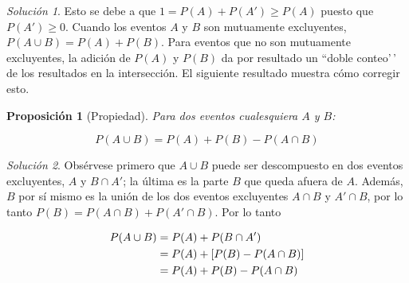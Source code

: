 \documentclass[
  11pt,
]{book}
\newtheorem{proposition}{Proposición}[chapter]
\theoremstyle{definition}
\theoremstyle{definition}
\theoremstyle{definition}
\theoremstyle{definition}
\theoremstyle{remark}
\newtheorem*{solution}{Solución }
\begin{document}
\begin{solution}
Esto se debe a que \(1 = P(A) + P(A') \geq P(A)\) puesto que \(P(A') \geq 0\). Cuando los eventos \(A\) y \(B\) son mutuamente excluyentes, \(P(A \cup B) = P(A) + P(B)\). Para eventos que no son mutuamente excluyentes, la adición de \(P(A)\) y \(P(B)\) da por resultado un ``doble conteo'\,' de los resultados en la intersección. El siguiente resultado muestra cómo corregir esto.
\end{solution}

\begin{proposition}[Propiedad]
Para dos eventos cualesquiera \(A\) y \(B\):

\[
P(A \cup B) = P(A) + P(B) - P(A \cap B)
\]
\end{proposition}

\begin{solution}

Obsérvese primero que \(A \cup B\) puede ser descompuesto en dos eventos excluyentes, \(A\) y \(B \cap A'\); la última es la parte \(B\) que queda afuera de \(A\). Además, \(B\) por sí mismo es la unión de los dos eventos excluyentes \(A \cap B\) y \(A' \cap B\), por lo tanto \(P(B) = P(A \cap B) + P(A' \cap B)\). Por lo tanto

\begin{equation}
\notag
\begin{split}
P(A \cup B) &= P(A) + P(B \cap A') \\
&= P(A) + [P(B) - P(A \cap B)] \\
&= P(A) + P(B) - P(A \cap B)
\end{split}
\end{equation}

\end{solution}
\end{document}
